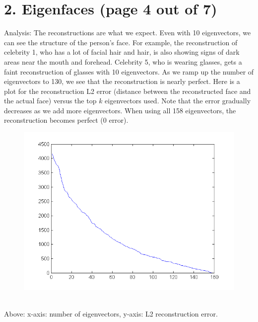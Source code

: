 \documentclass[11pt]{article}
\begin{document}
\section*{2. Eigenfaces (page 4 out of 7)}
Analysis: The reconstructions are what we expect. Even with 10 eigenvectors, we can see the structure of the person's face. For example, the reconstruction of celebrity 1, who has a lot of facial hair and hair, is also showing signs of dark areas near the mouth and forehead. Celebrity 5, who is wearing glasses, gets a faint reconstruction of glasses with 10 eigenvectors. As we ramp up the number of eigenvectors to 130, we see that the reconstruction is nearly perfect. Here is a plot for the reconstruction L2 error (distance between the reconstructed face and the actual face) versus the top $k$ eigenvectors used. Note that the  error gradually decreases as we add more eigenvectors. When using all 158 eigenvectors, the reconstruction becomes perfect (0 error). \\
\begin{figure}[ht!]
\centering
\includegraphics[width=180mm]{images/hw7q2berror.png}
\label{overflow}
\end{figure} \\
Above: x-axis: number of eigenvectors, y-axis: L2 reconstruction error.
\newpage
\end{document}
